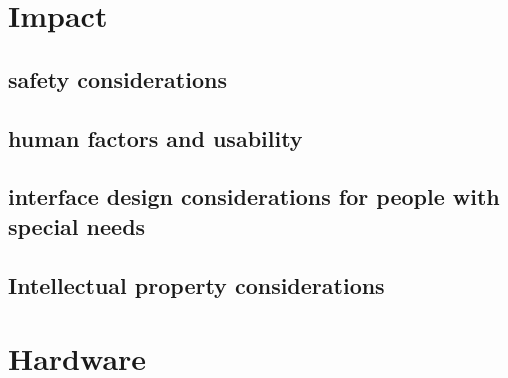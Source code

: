 \documentclass[10pt]{article}
\begin{document}
\begin{comment}
  | A fan                      | $10.93 | \href{http://www.digikey.com/product-detail/en/EFB0612HHA/603-1026-ND/1014357?WT.mc_id=IQ_7595_G_pla1014357}{Potential fan}                                               |   |
  | Mirror                     | $12.02 | \href{http://www.onlinemetals.com/merchant.cfm?pid=7895&step=4&id=735&Cj0KEQjwvve_BRDmg9Kt9ufO15EBEiQAKoc6qk8IH2ER5s-AwA1TZpkKCJNiQJXJGtpEh3BDggOUHxoaApnE8P8HAQ}{Mirror} |   |
  | Speaker Actuator           | $0.00  | Will be salvaged                                                                                                                                                          |   |
  | TOTAL                      | $76.27 |                                                                                                                                                                           |   |
\end{comment}

\section{Impact}
\subsection{safety considerations}
\subsection{human factors and usability}
\subsection{interface design considerations for people with special needs}
\subsection{Intellectual property considerations}

\section{Hardware}
\end{document}
